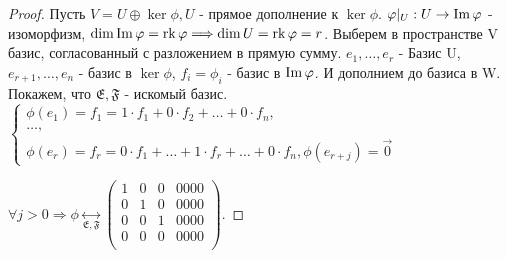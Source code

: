 \begin{proof}
	Пусть \(V = U\oplus \ker \phi, U\) - прямое дополнение к $\ker\phi$. \(\varphi|_U: U\to \operatorname{Im} \varphi\) - изоморфизм, \(\dim\operatorname{Im}\varphi = \operatorname{rk} \varphi \Longrightarrow \dim U = \operatorname{rk} \varphi = r\). 
	Выберем в пространстве V базис, согласованный с разложением в прямую сумму. 
	\(e_1, \ldots, e_r\) - Базис U, \(e_{r+1}, \ldots, e_n\) - базис в \(\ker\phi\), \(f_i = \phi_i\) - базис в \(\operatorname{Im}\varphi\).
	 И дополнием до базиса в W. Покажем, что \(\mathfrak{E}, \mathfrak{F}\) - искомый базис. 
	 \(\begin{cases*} 
		\phi(e_1) = f_1 = 1\cdot f_1 + 0\cdot f_2 + \ldots + 0\cdot f_n, \\
		\ldots,\\
		\phi(e_r) = f_r = 0\cdot f_1 + \ldots + 1\cdot f_r + \ldots + 0\cdot f_n, 
		\phi(e_{r+j}) = \vec 0 
	\end{cases*}\)

	\(\forall j>0\Longrightarrow \phi\underset{\mathfrak{E}, \mathfrak{F}}{\longleftrightarrow} \begin{pmatrix}
		1 & 0 & 0 & 0000 \\
		0 & 1 & 0 & 0000\\
		0 & 0 & 1 & 0000 \\
		0 & 0 & 0 & 0000 \\
	\end{pmatrix}\).
\end{proof}